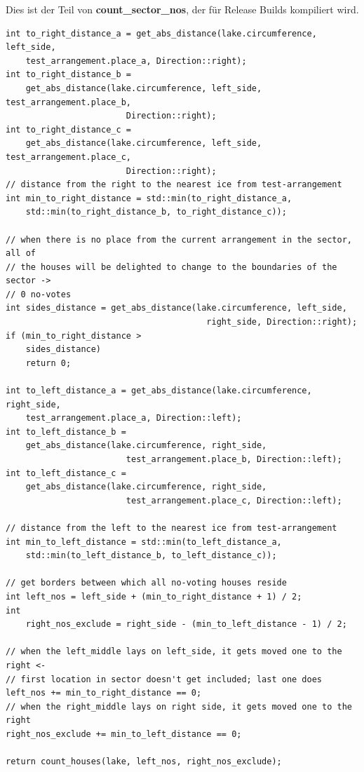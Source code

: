 \documentclass[a4paper,10pt,ngerman,captions=figureheading]{scrartcl}
\begin{document}
Dies ist der Teil von \textbf{count\_sector\_nos}, der für Release Builds kompiliert wird.
\begin{lstlisting}
int to_right_distance_a = get_abs_distance(lake.circumference, left_side,
    test_arrangement.place_a, Direction::right);
int to_right_distance_b =
    get_abs_distance(lake.circumference, left_side, test_arrangement.place_b,
                        Direction::right);
int to_right_distance_c =
    get_abs_distance(lake.circumference, left_side, test_arrangement.place_c,
                        Direction::right);
// distance from the right to the nearest ice from test-arrangement
int min_to_right_distance = std::min(to_right_distance_a,
    std::min(to_right_distance_b, to_right_distance_c));

// when there is no place from the current arrangement in the sector, all of
// the houses will be delighted to change to the boundaries of the sector ->
// 0 no-votes
int sides_distance = get_abs_distance(lake.circumference, left_side,
                                        right_side, Direction::right);
if (min_to_right_distance >
    sides_distance)
    return 0;

int to_left_distance_a = get_abs_distance(lake.circumference, right_side,
    test_arrangement.place_a, Direction::left);
int to_left_distance_b =
    get_abs_distance(lake.circumference, right_side,
                        test_arrangement.place_b, Direction::left);
int to_left_distance_c =
    get_abs_distance(lake.circumference, right_side,
                        test_arrangement.place_c, Direction::left);

// distance from the left to the nearest ice from test-arrangement
int min_to_left_distance = std::min(to_left_distance_a,
    std::min(to_left_distance_b, to_left_distance_c));

// get borders between which all no-voting houses reside
int left_nos = left_side + (min_to_right_distance + 1) / 2;
int
    right_nos_exclude = right_side - (min_to_left_distance - 1) / 2;

// when the left_middle lays on left_side, it gets moved one to the right <-
// first location in sector doesn't get included; last one does
left_nos += min_to_right_distance == 0;
// when the right_middle lays on right side, it gets moved one to the right
right_nos_exclude += min_to_left_distance == 0;

return count_houses(lake, left_nos, right_nos_exclude);
\end{lstlisting}
\end{document}
